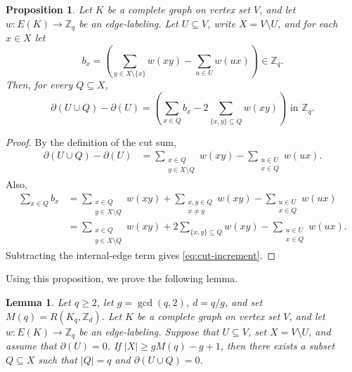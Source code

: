 ﻿\documentclass[11pt]{article}
\numberwithin{equation}{section}
\newtheorem{proposition}[theorem]{Proposition}
\newtheorem{lemma}[theorem]{Lemma}
\theoremstyle{remark}
\newcommand{\Z}{\mathbb Z}
\begin{document}
\begin{proposition}\label{prop:cut-increment}
    Let $K$ be a complete graph on vertex set $V$, and let $w\colon E(K)\to\Z_q$ be an edge-labeling.
    Let $U\subseteq V$, write $X=V\setminus U$, and for each $x\in X$ let
    \[
        b_x=\left(\sum_{y\in X\setminus\{x\}}w(xy)-\sum_{u\in U}w(ux)\right)\in\Z_q.
    \]
    Then, for every $Q\subseteq X$,
    \begin{equation}\label{eq:cut-increment}
        \partial(U\cup Q)-\partial(U)=\left(\sum_{x\in Q}b_x-2\sum_{\{x,y\}\subseteq Q}w(xy)\right)
        \text{ in }\Z_q.
    \end{equation}
\end{proposition}

\begin{proof}
    By the definition of the cut sum,
    \[
        \begin{aligned}
            \partial(U\cup Q)-\partial(U)
             & =\sum_{\substack{x\in Q \\ y\in X\setminus Q}}w(xy)
            -\sum_{\substack{u\in U    \\ x\in Q}}w(ux).
        \end{aligned}
    \]
    Also,
    \[
        \begin{aligned}
            \sum_{x\in Q}b_x
             & =\sum_{\substack{x\in Q \\ y\in X\setminus Q}}w(xy)
            +\sum_{\substack{x,y\in Q  \\ x\ne y}}w(xy)
            -\sum_{\substack{u\in U    \\ x\in Q}}w(ux)  \\
             & =\sum_{\substack{x\in Q \\ y\in X\setminus Q}}w(xy)
            +2\sum_{\{x,y\}\subseteq Q}w(xy)
            -\sum_{\substack{u\in U    \\ x\in Q}}w(ux).
        \end{aligned}
    \]
    Subtracting the internal-edge term gives \eqref{eq:cut-increment}.
\end{proof}

Using this proposition, we prove the following lemma.
\begin{lemma}\label{lem:block-insertion}
    Let $q\ge2$, let $g=\gcd(q,2)$, $d=q/g$, and set $M(q)=R(K_q,\Z_d)$.
    Let $K$ be a complete graph on vertex set $V$, and let $w\colon E(K)\to\Z_q$ be an edge-labeling.
    Suppose that $U\subseteq V$, set $X=V\setminus U$, and assume that $\partial(U)=0$.
    If $|X|\ge gM(q)-g+1$, then there exists a subset $Q\subseteq X$ such that $|Q|=q$ and $\partial(U\cup Q)=0$.
\end{lemma}
\end{document}
